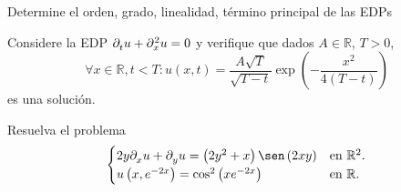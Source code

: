 Determine el orden, grado, linealidad, término principal de las EDPs
\begin{multicols}{3}
\end{multicols}

\question

Considere la EDP
\begin{math}
	\difcp{u}{t}+
	\difcp[2]{u}{x}=0
\end{math}
y verifique que dados $A\in\mathbb{R}$, $T>0$,
\begin{equation*}
	\forall x\in\mathbb{R},
	t<T:
	u\left(x,t\right)=
	\frac{A\sqrt{T}}{\sqrt{T-t}}
	\exp\left(-\frac{x^{2}}{4\left(T-t\right)}\right)
\end{equation*}
es una solución.

\question

Resuelva el problema
\begin{equation*}
	\begin{cases}
		2y\difcp{u}{x}+
		\difcp{u}{y}=
		\left(2y^{2}+x\right)
		\sen\left(2xy\right)  &
		\text{en }\mathbb{R}^{2}. \\
		u\left(x,e^{-2x}\right)=
		\cos^{2}
		\left(xe^{-2x}\right) &
		\text{en }\mathbb{R}.
	\end{cases}
\end{equation*}

